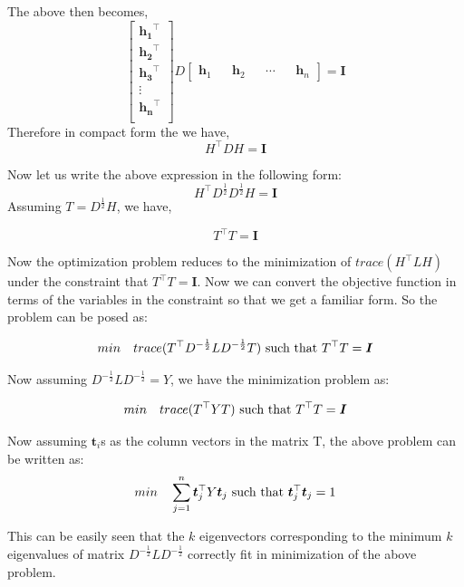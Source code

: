 \documentclass[english]{article}
\theoremstyle{plain}
\begin{document}
The above then becomes,
\begin{equation}
\begin{bmatrix}
\boldsymbol{h_{1}}^{\top} \\
\boldsymbol{h_{2}}^{\top} \\
\boldsymbol{h_{3}}^{\top} \\
\vdots \\
\boldsymbol{h_{n}}^{\top} \\
\end{bmatrix}
D
\begin{bmatrix}
\boldsymbol{h}_{1} && \boldsymbol{h}_{2} && \cdots && \boldsymbol{h}_{n} 
\end{bmatrix} = \boldsymbol{I} 
\end{equation}
Therefore in compact form the we have,
\begin{equation}
H^{\top}DH = \boldsymbol{I}
\end{equation}

Now let us write the above expression in the following form:
\begin{equation}
H^{\top}D^{\frac{1}{2}}D^{\frac{1}{2}}H = \boldsymbol{I}
\end{equation}
Assuming $T = D^{\frac{1}{2}}H$, we have,

\begin{equation}
T^{\top}T = \boldsymbol{I}
\end{equation}

Now the optimization problem reduces to the minimization of $trace(H^{\top}LH)$ under the constraint that $T^{\top}T = \boldsymbol{I}$. Now we can convert the objective function in terms of the variables in the constraint so that we get a familiar form. So the problem can be posed as:

\begin{equation}
min \textnormal{\quad} trace (T^{\top}D^{-\frac{1}{2}}LD^{-\frac{1}{2}}T) \textnormal{ such that } T^{\top}T = \boldsymbol{I}
\end{equation}

Now assuming $D^{-\frac{1}{2}}LD^{-\frac{1}{2}}=Y$, we have the minimization problem as:

\begin{equation}
min \textnormal{\quad} trace (T^{\top}YT) \textnormal{ such that } T^{\top}T = \boldsymbol{I}
\end{equation}

Now assuming $\boldsymbol{t}_{i}$s as the column vectors in the matrix T, the above problem can be written as:
\begin{equation}
min \quad \sum_{j=1}^{n} \boldsymbol{t}_{j}^{\top}Y\boldsymbol{t}_{j} \textnormal{ such that } \boldsymbol{t}_{j}^{\top}\boldsymbol{t}_{j} = 1
\end{equation}

This can be easily seen that the $k$ eigenvectors corresponding to the minimum $k$ eigenvalues of matrix $D^{-\frac{1}{2}}LD^{-\frac{1}{2}}$ correctly fit in minimization of the above problem. 
\end{document}
